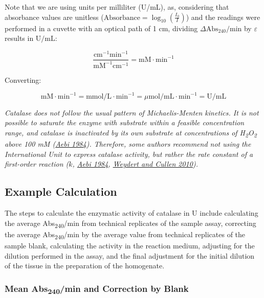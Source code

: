 \documentclass[
  9pt,
  american,
  a5paper,
  extrafontsizes,onecolumn,openright
  ]{memoir}
\newlength{\rf}
\begin{document}
Note that we are using units per milliliter (U/mL), as, considering that absorbance values are unitless (\(\text{Absorbance} = \log_{10} \left( \frac{I_0}{I} \right)\)) and the readings were performed in a cuvette with an optical path of 1 cm, dividing \(\Delta \text{Abs}_{240}/\text{min}\) by \(\varepsilon\) results in \(\text{U/mL}\):

\[ \frac{\text{cm}^{-1}\text{min}^{-1}}{\text{mM}^{-1}\text{cm}^{-1}} = \text{mM} \cdot \text{min}^{-1} \]

Converting:

\[ \text{mM} \cdot \text{min}^{-1} = \text{mmol/L} \cdot \text{min}^{-1} = \mu\text{mol/mL} \cdot \text{min}^{-1} = \text{U/mL} \]

\begin{greybox}[frametitle = Note]
\emph{Catalase does not follow the usual pattern of Michaelis-Menten kinetics. It is not possible to saturate the enzyme with substrate within a feasible concentration range, and catalase is inactivated by its own substrate at concentrations of H\textsubscript{2}O\textsubscript{2} above 100 mM (\href{https://doi.org/10.1016/S0076-6879(84)05016-3}{Aebi 1984}). Therefore, some authors recommend not using the International Unit to express catalase activity, but rather the rate constant of a first-order reaction (\(k\), \href{https://doi.org/10.1016/S0076-6879(84)05016-3}{Aebi 1984}, \href{https://doi.org/10.1038/nprot.2009.197}{Weydert and Cullen 2010}).}

\end{greybox}

\subsection{Example Calculation}\label{example-calculation}

The steps to calculate the enzymatic activity of catalase in U include calculating the average Abs\textsubscript{240}/min from technical replicates of the sample assay, correcting the average Abs\textsubscript{240}/min by the average value from technical replicates of the sample blank, calculating the activity in the reaction medium, adjusting for the dilution performed in the assay, and the final adjustment for the initial dilution of the tissue in the preparation of the homogenate.

\subsubsection{\texorpdfstring{Mean Abs\textsubscript{240}/min and Correction by Blank}{Mean Abs240/min and Correction by Blank}}\label{mean-abs240min-and-correction-by-blank}
\end{document}
